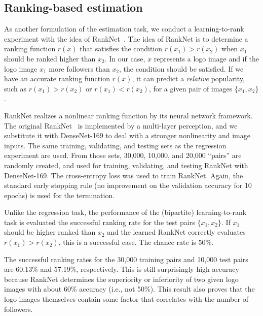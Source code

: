 \documentclass[runningheads]{llncs}
\begin{document}
\subsection{Ranking-based estimation}
As another formulation of the estimation task, we conduct a learning-to-rank experiment with the idea of RankNet~\cite{Burges2005}. The idea of RankNet is 
to determine a ranking function $r(x)$ that satisfies the condition $r(x_1)>r(x_2)$ when $x_1$ should be ranked higher than $x_2$. In our case, $x$ represents a logo image and if the logo image $x_1$ more followers than $x_2$, the condition should be satisfied. If we have an accurate ranking function $r(x)$, it can predict a {\it relative} popularity, such as $r(x_1)>r(x_2)$ or $r(x_1)<r(x_2)$, for a given pair of images $\{x_1, x_2\}$.
\par
RankNet realizes a nonlinear ranking function by its neural network framework. The original RankNet~\cite{Burges2005} is implemented by a multi-layer perception, and we substitute it with DenseNet-169 to deal with a stronger nonlinearity and image inputs.
The same training, validating, and testing sets as the regression experiment are used. From those sets, 30,000, 10,000, and 20,000 ``pairs'' are randomly created, 
and used for training, validating, and testing RankNet with DenseNet-169.
The cross-entropy loss was used to train RankNet. Again, the standard early stopping rule (no improvement on the validation accuracy for 10 epochs) is used for the termination. \par
%
Unlike the regression task, the performance of the (bipartite) learning-to-rank task is evaluated the successful ranking rate for the test pairs $\{x_1, x_2\}$. If $x_1$ should be higher ranked than $x_2$ and the learned RankNet correctly evaluates $r(x_1)>r(x_2)$, this is a successful case. The chance rate is 50\%.\par
%
The successful ranking rates for the 30,000 training pairs and 10,000 test pairs are  60.13\% and 57.19\%, respectively. This is still surprisingly high accuracy because RankNet determines the superiority or inferiority of two given logo images with about 60\% accuracy (i.e., not 50\%). This result also proves that the logo images themselves contain some factor that correlates with the number of followers.




\end{document}
